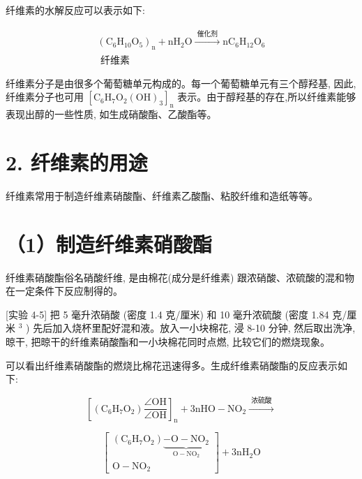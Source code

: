 \documentclass[10pt]{article}
\begin{document}
纤维素的水解反应可以表示如下:

\[
\begin{matrix} {\left( {\mathrm{C}}_{6}{\mathrm{H}}_{10}{\mathrm{O}}_{5}\right) }_{\mathrm{n}} + {\mathrm{{nH}}}_{2}\mathrm{O}\xrightarrow[]{\text{ 催化剂 }}{\mathrm{{nC}}}_{6}{\mathrm{H}}_{12}{\mathrm{O}}_{6} \\ \text{ 纤维素 } \end{matrix}
\]

纤维素分子是由很多个葡萄糖单元构成的。每一个葡萄糖单元有三个醇羟基, 因此, 纤维素分子也可用 \({\left\lbrack {\mathrm{C}}_{6}{\mathrm{H}}_{7}{\mathrm{O}}_{2}{\left( \mathrm{{OH}}\right) }_{3}\right\rbrack }_{\mathrm{n}}\) 表示。由于醇羟基的存在,所以纤维素能够表现出醇的一些性质, 如生成硝酸酯、乙酸酯等。

\section*{2. 纤维素的用途}

纤维素常用于制造纤维素硝酸酯、纤维素乙酸酯、粘胶纤维和造纸等等。

\section*{（1）制造纤维素硝酸酯}

纤维素硝酸酯俗名硝酸纤维, 是由棉花(成分是纤维素) 跟浓硝酸、浓硫酸的混和物在一定条件下反应制得的。

[实验 4-5] 把 5 毫升浓硝酸 (密度 1.4 克/厘米) 和 10 毫升浓硫酸 (密度 1.84 克/厘米 \({}^{3}\) ) 先后加入烧杯里配好混和液。放入一小块棉花, 浸 8-10 分钟, 然后取出洗净, 晾干, 把晾干的纤维素硝酸酯和一小块棉花同时点燃, 比较它们的燃烧现象。

可以看出纤维素硝酸酯的燃烧比棉花迅速得多。生成纤维素硝酸酯的反应表示如下:

\[
{\left\lbrack \left( {\mathrm{C}}_{6}{\mathrm{H}}_{7}{\mathrm{O}}_{2}\right) \frac{\angle \mathrm{{OH}}}{\angle \mathrm{{OH}}}\right\rbrack }_{\mathrm{n}} + 3\mathrm{{nHO}} - {\mathrm{{NO}}}_{2}\xrightarrow[]{\text{ 浓硫酸 }}
\]

\[
\left\lbrack \begin{matrix} \left( {{\mathrm{C}}_{6}{\mathrm{H}}_{7}{\mathrm{O}}_{2}}\right) \underset{\mathrm{O} - {\mathrm{{NO}}}_{2}}{\underbrace{-\mathrm{O} - {\mathrm{{NO}}}_{2}}} \\ \mathrm{O} - {\mathrm{{NO}}}_{2} \end{matrix}\right\rbrack + 3{\mathrm{{nH}}}_{2}\mathrm{O}
\]
\end{document}
